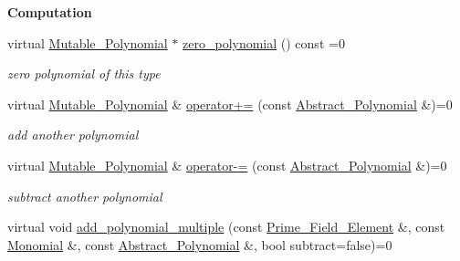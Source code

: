 \begin{Indent}\textbf{ Computation}\par
\begin{DoxyCompactItemize}
\item 
\mbox{\label{class_mutable___polynomial_aa7a14a4cbb110840e55d656d7c6fe3ff}} 
virtual \hyperlink{class_mutable___polynomial}{Mutable\+\_\+\+Polynomial} $\ast$ \hyperlink{class_mutable___polynomial_aa7a14a4cbb110840e55d656d7c6fe3ff}{zero\+\_\+polynomial} () const =0
\begin{DoxyCompactList}\small\item\em zero polynomial of this type \end{DoxyCompactList}\item 
\mbox{\label{class_mutable___polynomial_a4d581c9c777591ab2cfdb3b4139c21da}} 
virtual \hyperlink{class_mutable___polynomial}{Mutable\+\_\+\+Polynomial} \& \hyperlink{class_mutable___polynomial_a4d581c9c777591ab2cfdb3b4139c21da}{operator+=} (const \hyperlink{class_abstract___polynomial}{Abstract\+\_\+\+Polynomial} \&)=0
\begin{DoxyCompactList}\small\item\em add another polynomial \end{DoxyCompactList}\item 
\mbox{\label{class_mutable___polynomial_a6582d3b7af8a58f9645aac72fec01614}} 
virtual \hyperlink{class_mutable___polynomial}{Mutable\+\_\+\+Polynomial} \& \hyperlink{class_mutable___polynomial_a6582d3b7af8a58f9645aac72fec01614}{operator-\/=} (const \hyperlink{class_abstract___polynomial}{Abstract\+\_\+\+Polynomial} \&)=0
\begin{DoxyCompactList}\small\item\em subtract another polynomial \end{DoxyCompactList}\item 
\mbox{\label{class_mutable___polynomial_add21309f55af6a58e1d9b1623a0bb09a}} 
virtual void \hyperlink{class_mutable___polynomial_add21309f55af6a58e1d9b1623a0bb09a}{add\+\_\+polynomial\+\_\+multiple} (const \hyperlink{class_prime___field___element}{Prime\+\_\+\+Field\+\_\+\+Element} \&, const \hyperlink{class_monomial}{Monomial} \&, const \hyperlink{class_abstract___polynomial}{Abstract\+\_\+\+Polynomial} \&, bool subtract=false)=0

\end{DoxyCompactItemize}
\end{Indent}
